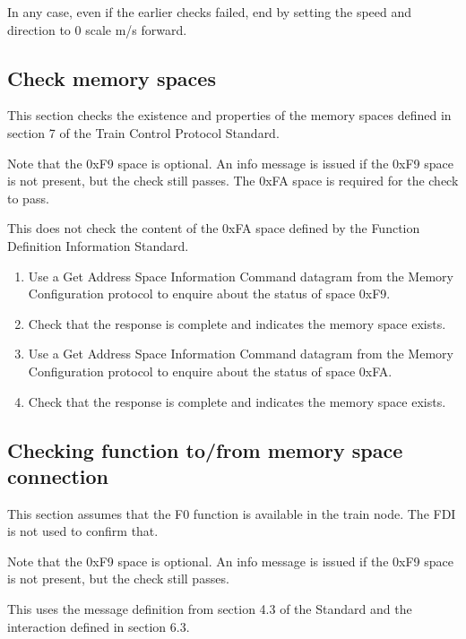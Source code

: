 In any case, even if the earlier checks failed, end by setting the speed 
and direction to 0 scale m/s forward.

\subsection{Check memory spaces}

This section checks the existence and properties of the memory spaces defined in section 7
of the Train Control Protocol Standard.

Note that the 0xF9 space is optional.  An info message is issued if the 0xF9 space
is not present, but the check still passes.  The 0xFA space is required for the check to pass.

This does not check the content of the 0xFA space defined by the 
Function Definition Information Standard.

\begin{enumerate}

\item Use a Get Address Space Information Command datagram from the Memory Configuration protocol
to enquire about the status of space 0xF9.

\item Check that the response is complete and indicates the memory space exists.

\item Use a Get Address Space Information Command datagram from the Memory Configuration protocol
to enquire about the status of space 0xFA.

\item Check that the response is complete and indicates the memory space exists.

\end{enumerate}
    
\subsection{Checking function to/from memory space connection}

This section assumes that the F0 function is available in the train node.
The FDI is not used to confirm that.

Note that the 0xF9 space is optional.  An info message is issued if the 0xF9 space
is not present, but the check still passes.

This uses the message definition from section 4.3 of the Standard 
and the interaction defined in section 6.3.

